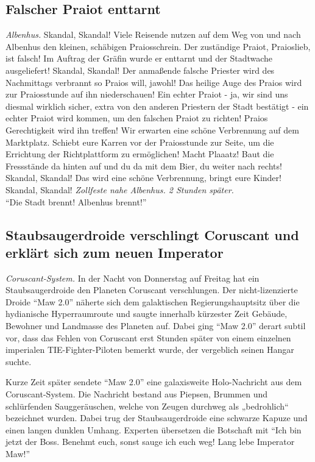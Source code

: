 \documentclass[final]{multiversum}
\begin{document}
\subsection{Falscher Praiot enttarnt}
\textit{Albenhus.} 
Skandal, Skandal!
Viele Reisende nutzen auf dem Weg von und nach Albenhus den kleinen, schäbigen Praiosschrein.
Der zuständige Praiot, Praioslieb, ist falsch!
Im Auftrag der Gräfin wurde er enttarnt und der Stadtwache ausgeliefert!
Skandal, Skandal!
Der anmaßende falsche Priester wird des Nachmittags verbrannt so Praios will, jawohl!
Das heilige Auge des Praios wird zur Praiosstunde auf ihn niederschauen!
Ein echter Praiot - ja, wir sind uns diesmal wirklich sicher, extra von den anderen Priestern der Stadt bestätigt - ein echter Praiot wird kommen, um den falschen Praiot zu richten!
Praios Gerechtigkeit wird ihn treffen!
Wir erwarten eine schöne Verbrennung auf dem Marktplatz.
Schiebt eure Karren vor der Praiosstunde zur Seite, um die Errichtung der Richtplattform zu ermöglichen!
Macht Plaaatz!
Baut die Fressstände da hinten auf und du da mit dem Bier, du weiter nach rechts!
Skandal, Skandal!
Das wird eine schöne Verbrennung, bringt eure Kinder!
Skandal, Skandal!
\vspace{1em}
\textit{Zollfeste nahe Albenhus. 2 Stunden später.}\\
\enquote{Die Stadt brennt! Albenhus brennt!}

\subsection{Staubsaugerdroide verschlingt Coruscant und erklärt sich zum neuen Imperator}

\textit{Coruscant-System.} 
In der Nacht von Donnerstag auf Freitag hat ein Staubsaugerdroide den Planeten Coruscant verschlungen. 
Der nicht-lizenzierte Droide \enquote{Maw 2.0} näherte sich dem galaktischen Regierungshauptsitz über die hydianische Hyperraumroute und saugte innerhalb kürzester Zeit Gebäude, Bewohner und Landmasse des Planeten auf. 
Dabei ging \enquote{Maw 2.0} derart subtil vor, dass das Fehlen von Coruscant erst Stunden später von einem einzelnen imperialen TIE-Fighter-Piloten bemerkt wurde, der vergeblich seinen Hangar suchte. 

Kurze Zeit später sendete \enquote{Maw 2.0} eine galaxisweite Holo-Nachricht aus dem Coruscant-System. 
Die Nachricht bestand aus Piepsen, Brummen und schlürfenden Sauggeräuschen, welche von Zeugen durchweg als „bedrohlich“ bezeichnet wurden. 
Dabei trug der Staubsaugerdroide eine schwarze Kapuze und einen langen dunklen Umhang. 
Experten übersetzen die Botschaft mit \enquote{Ich bin jetzt der Boss. 
Benehmt euch, sonst sauge ich euch weg! Lang lebe Imperator Maw!}
\end{document}

